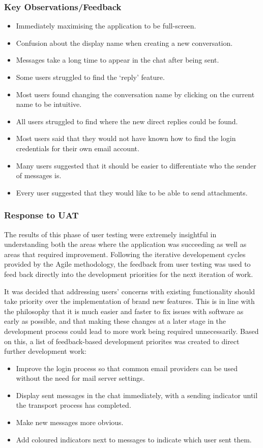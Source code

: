 \subsubsection{Key Observations/Feedback}
\begin{itemize}
  \item Immediately maximising the application to be full-screen.
  \item Confusion about the display name when creating a new conversation.
  \item Messages take a long time to appear in the chat after being sent.
  \item Some users struggled to find the `reply' feature.
  \item Most users found changing the conversation name by clicking on the current name to be intuitive.
  \item All users struggled to find where the new direct replies could be found.
  \item Most users said that they would not have known how to find the login credentials for their own email account.
  \item Many users suggested that it should be easier to differentiate who the sender of messages is.
  \item Every user suggested that they would like to be able to send attachments.
\end{itemize}

\subsubsection{Response to UAT}
The results of this phase of user testing were extremely insightful in understanding both the areas where the application was succeeding as well as areas that required improvement. Following the iterative developement cycles provided by the Agile methodology, the feedback from user testing was used to feed back directly into the development priorities for the next iteration of work.

It was decided that addressing users' concerns with existing functionality should take priority over the implementation of brand new features. This is in line with the philosophy that it is much easier and faster to fix issues with software as early as possible, and that making these changes at a later stage in the development process could lead to more work being required unnecessarily. Based on this, a list of feedback-based development priorites was created to direct further development work:

\begin{itemize}
  \item Improve the login process so that common email providers can be used without the need for mail server settings.
  \item Display sent messages in the chat immediately, with a sending indicator until the transport process has completed.
  \item Make new messages more obvious.
  \item Add coloured indicators next to messages to indicate which user sent them.
\end{itemize}